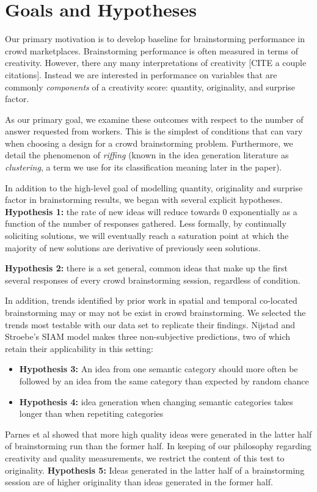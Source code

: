 \section{Goals and Hypotheses}

Our primary motivation is to develop baseline for brainstorming performance in crowd marketplaces. Brainstorming performance is often measured in terms of creativity. However, there any many interpretations of creativity [CITE a couple citations]. Instead we are interested in performance on variables that are commonly \emph{components} of a creativity score: quantity, originality, and surprise factor.

As our primary goal, we examine these outcomes with respect to the number of answer requested from workers. This is the simplest of conditions that can vary when choosing a design for a crowd brainstorming problem. Furthermore, we detail the phenomenon of \emph{riffing} (known in the idea generation literature as \emph{clustering}, a term we use for its classification meaning later in the paper).

In addition to the high-level goal of modelling quantity, originality and surprise factor in brainstorming results, we began with several explicit hypotheses. \textbf{Hypothesis 1:} the rate of new ideas will reduce towards 0 exponentially as a function of the number of responses gathered. Less formally, by continually soliciting solutions, we will eventually reach a saturation point at which the majority of new solutions are derivative of previously seen solutions.

\textbf{Hypothesis 2:} there is a set general, common ideas that make up the first several responses of every crowd brainstorming session, regardless of condition. 

In addition, trends identified by prior work in spatial and temporal co-located brainstorming may or may not be exist in crowd brainstorming. We selected the trends most testable with our data set to replicate their findings. Nijstad and Stroebe's SIAM model \cite{nijstad_how_2006} makes three non-subjective predictions, two of which retain their applicability in this setting:

\begin{itemize}
\item \textbf{Hypothesis 3:} An idea from one semantic category should more often be followed by an idea from the same category than expected by random chance
\item \textbf{Hypothesis 4:} idea generation when changing semantic categories takes longer than when repetiting categories
\end{itemize}

Parnes et al \cite{parnes_effects_1961} showed that more high quality ideas were generated in the latter half of brainstorming run than the former half. In keeping of our philosophy regarding creativity and quality measurements, we restrict the content of this test to originality. \textbf{Hypothesis 5:} Ideas generated in the latter half of a brainstorming session are of higher originality than ideas generated in the former half.


